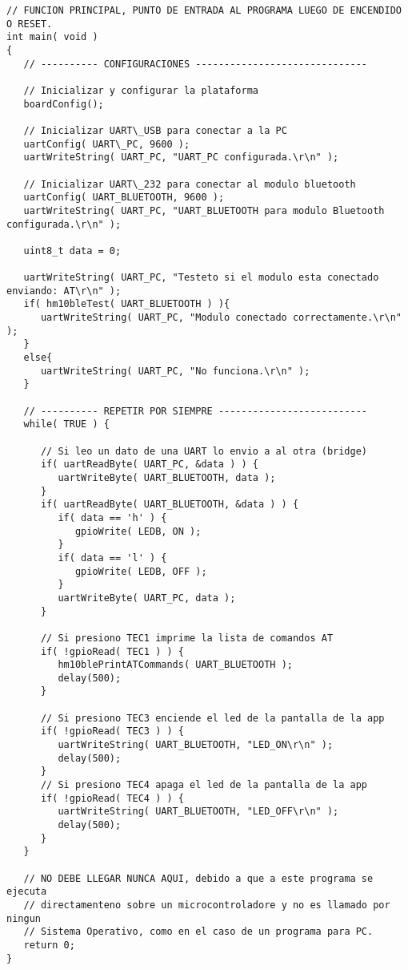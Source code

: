 \begin{lstlisting}
// FUNCION PRINCIPAL, PUNTO DE ENTRADA AL PROGRAMA LUEGO DE ENCENDIDO O RESET.
int main( void )
{
   // ---------- CONFIGURACIONES ------------------------------

   // Inicializar y configurar la plataforma
   boardConfig();

   // Inicializar UART\_USB para conectar a la PC
   uartConfig( UART\_PC, 9600 );
   uartWriteString( UART_PC, "UART_PC configurada.\r\n" );

   // Inicializar UART\_232 para conectar al modulo bluetooth
   uartConfig( UART_BLUETOOTH, 9600 );
   uartWriteString( UART_PC, "UART_BLUETOOTH para modulo Bluetooth configurada.\r\n" );
   
   uint8_t data = 0;
   
   uartWriteString( UART_PC, "Testeto si el modulo esta conectado enviando: AT\r\n" );
   if( hm10bleTest( UART_BLUETOOTH ) ){
      uartWriteString( UART_PC, "Modulo conectado correctamente.\r\n" );
   }
   else{
      uartWriteString( UART_PC, "No funciona.\r\n" );
   }

   // ---------- REPETIR POR SIEMPRE --------------------------
   while( TRUE ) {

      // Si leo un dato de una UART lo envio a al otra (bridge)
      if( uartReadByte( UART_PC, &data ) ) {
         uartWriteByte( UART_BLUETOOTH, data );
      }
      if( uartReadByte( UART_BLUETOOTH, &data ) ) {
         if( data == 'h' ) {
            gpioWrite( LEDB, ON );
         }
         if( data == 'l' ) {
            gpioWrite( LEDB, OFF );
         }
         uartWriteByte( UART_PC, data );
      }
      
      // Si presiono TEC1 imprime la lista de comandos AT
      if( !gpioRead( TEC1 ) ) {
         hm10blePrintATCommands( UART_BLUETOOTH );
         delay(500);
      }
      
      // Si presiono TEC3 enciende el led de la pantalla de la app
      if( !gpioRead( TEC3 ) ) {
         uartWriteString( UART_BLUETOOTH, "LED_ON\r\n" );
         delay(500);
      }
      // Si presiono TEC4 apaga el led de la pantalla de la app
      if( !gpioRead( TEC4 ) ) {
         uartWriteString( UART_BLUETOOTH, "LED_OFF\r\n" );
         delay(500);
      }
   }

   // NO DEBE LLEGAR NUNCA AQUI, debido a que a este programa se ejecuta
   // directamenteno sobre un microcontroladore y no es llamado por ningun
   // Sistema Operativo, como en el caso de un programa para PC.
   return 0;
}
\end{lstlisting}

